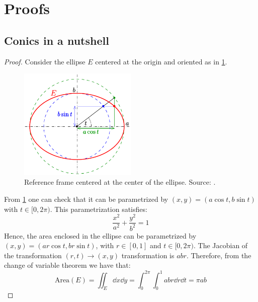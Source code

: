 \documentclass[../main.tex]{subfiles}
\begin{document}
\section{Proofs}\label{sec:proofs_appendix}
\subsection{Conics in a nutshell}\label{sec:app1}

\ellipsearea*
\begin{proof}
  Consider the ellipse $E$ centered at the origin and oriented as in \cref{fig:circle-ellipse}.
  \begin{figure}[htbp]
    \centering
    \includegraphics[width=0.5\textwidth]{Images/circles-ellipse.pdf}
    \caption{Reference frame centered at the center of the ellipse. Source: \cite{wiki:conic-ellipse}.}
    \label{fig:circle-ellipse}
  \end{figure}

  From \cref{fig:circle-ellipse} one can check that it can be parametrized by $(x,y)=(a\cos t,b\sin t)$ with $ t\in[0,2\pi)$. This parametrization satisfies:
  \begin{equation}
    \frac{x^2}{a^2}+\frac{y^2}{b^2}=1
  \end{equation}
  Hence, the area enclosed in the ellipse can be parametrized by $(x, y)=(ar\cos t,br\sin t)$, with $r\in[0,1]$ and $t\in[0,2\pi)$. The Jacobian of the transformation $(r,t)\to (x,y)$ transformation is $abr$. Therefore, from the change of variable theorem we have that:
  \begin{equation}
    \mathrm{Area}(E)=\iint_E\dd{x}\dd{y}=\int_{0}^{2\pi}\int_{0}^{1}abr\dd{r}\dd{t}=\pi ab
  \end{equation}
\end{proof}
\end{document}
